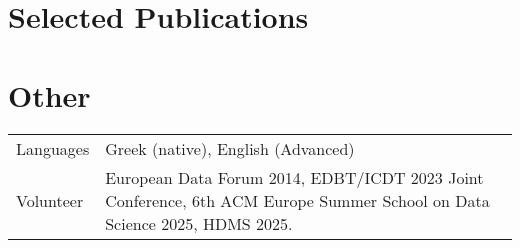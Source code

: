 \documentclass[a4paper,12pt]{article}
\begin{document}




\section{Selected Publications}


\begin{refsection}
	\nocite{*}
	\printbibliography[heading=none]
\end{refsection}


\section{Other}
\begin{tabularx}{\linewidth}{@{}l X@{}}
	Languages
	&  \normalsize{Greek (native), English (Advanced)	}\\
	
	
	
	
	Volunteer	&  \normalsize{European Data Forum 2014, EDBT/ICDT 2023 Joint Conference, 6th ACM Europe Summer School on Data Science 2025, HDMS 2025.
		
	}\\ 
\end{tabularx}
\end{document}
